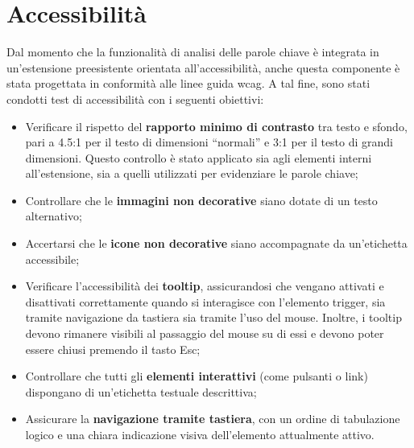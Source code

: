 \section{Accessibilità}

\par Dal momento che la funzionalità di analisi delle parole chiave è integrata in un’estensione preesistente orientata all’accessibilità, anche questa componente è stata progettata in conformità alle linee guida \gls{wcag}. A tal fine, sono stati condotti test di accessibilità con i seguenti obiettivi:
\begin{itemize}
  \item Verificare il rispetto del \textbf{rapporto minimo di contrasto} tra testo e sfondo, pari a 4.5:1 per il testo di dimensioni “normali” e 3:1 per il testo di grandi dimensioni. Questo controllo è stato applicato sia agli elementi interni all’estensione, sia a quelli utilizzati per evidenziare le parole chiave;
  \item Controllare che le \textbf{immagini non decorative} siano dotate di un testo alternativo;
  \item Accertarsi che le \textbf{icone non decorative} siano accompagnate da un’etichetta accessibile;
  \item Verificare l’accessibilità dei \textbf{tooltip}, assicurandosi che vengano attivati e disattivati correttamente quando si interagisce con l’elemento trigger, sia tramite navigazione da tastiera sia tramite l’uso del mouse. Inoltre, i tooltip devono rimanere visibili al passaggio del mouse su di essi e devono poter essere chiusi premendo il tasto Esc;
  \item Controllare che tutti gli \textbf{elementi interattivi} (come pulsanti o link) dispongano di un’etichetta testuale descrittiva;
  \item Assicurare la \textbf{navigazione tramite tastiera}, con un ordine di tabulazione logico e una chiara indicazione visiva dell’elemento attualmente attivo.
\end{itemize}
